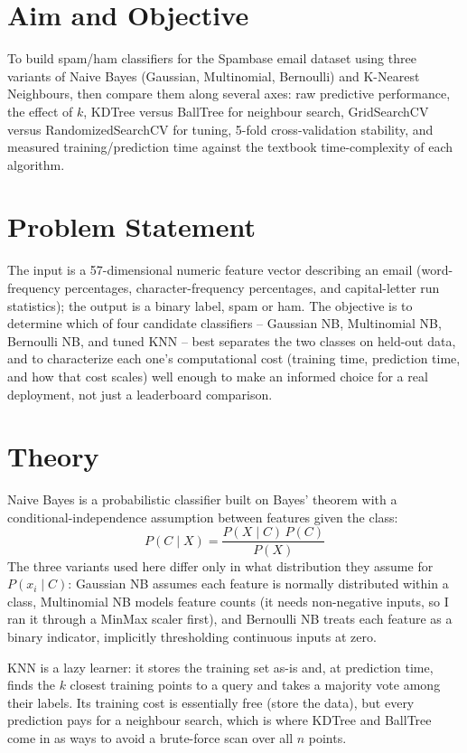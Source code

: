 \documentclass[11pt,a4paper]{article}
\begin{document}
\section{Aim and Objective}
To build spam/ham classifiers for the Spambase email dataset using three variants of Naive Bayes (Gaussian, Multinomial, Bernoulli) and K-Nearest Neighbours, then compare them along several axes: raw predictive performance, the effect of $k$, KDTree versus BallTree for neighbour search, GridSearchCV versus RandomizedSearchCV for tuning, 5-fold cross-validation stability, and measured training/prediction time against the textbook time-complexity of each algorithm.

\section{Problem Statement}
The input is a 57-dimensional numeric feature vector describing an email (word-frequency percentages, character-frequency percentages, and capital-letter run statistics); the output is a binary label, spam or ham. The objective is to determine which of four candidate classifiers -- Gaussian NB, Multinomial NB, Bernoulli NB, and tuned KNN -- best separates the two classes on held-out data, and to characterize each one's computational cost (training time, prediction time, and how that cost scales) well enough to make an informed choice for a real deployment, not just a leaderboard comparison.

\section{Theory}
Naive Bayes is a probabilistic classifier built on Bayes' theorem with a conditional-independence assumption between features given the class:
\[
P(C \mid X) = \frac{P(X \mid C)\, P(C)}{P(X)}
\]
The three variants used here differ only in what distribution they assume for $P(x_i \mid C)$: Gaussian NB assumes each feature is normally distributed within a class, Multinomial NB models feature counts (it needs non-negative inputs, so I ran it through a MinMax scaler first), and Bernoulli NB treats each feature as a binary indicator, implicitly thresholding continuous inputs at zero.

KNN is a lazy learner: it stores the training set as-is and, at prediction time, finds the $k$ closest training points to a query and takes a majority vote among their labels. Its training cost is essentially free (store the data), but every prediction pays for a neighbour search, which is where KDTree and BallTree come in as ways to avoid a brute-force scan over all $n$ points.
\end{document}
